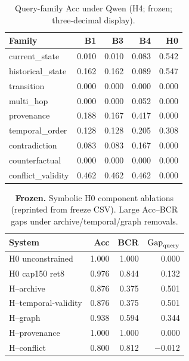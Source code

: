 \begin{table}[t]
\centering
\caption{Query-family Acc under Qwen (H4; frozen; three-decimal display).}
\label{tab:queryfam}
\scriptsize
\begin{tabular}{lrrrr}
\toprule
Family & B1 & B3 & B4 & H0 \\
\midrule
current\_state & 0.010 & 0.010 & 0.083 & 0.542 \\
historical\_state & 0.162 & 0.162 & 0.089 & 0.547 \\
transition & 0.000 & 0.000 & 0.000 & 0.000 \\
multi\_hop & 0.000 & 0.000 & 0.052 & 0.000 \\
provenance & 0.188 & 0.167 & 0.417 & 0.000 \\
temporal\_order & 0.128 & 0.128 & 0.205 & 0.308 \\
contradiction & 0.083 & 0.083 & 0.167 & 0.000 \\
counterfactual & 0.000 & 0.000 & 0.000 & 0.000 \\
conflict\_validity & 0.462 & 0.462 & 0.462 & 0.000 \\
\bottomrule
\end{tabular}
\end{table}

\begin{table}[t]
\centering
\caption{\textbf{Frozen.} Symbolic H0 component ablations (reprinted from freeze CSV). Large Acc--BCR gaps under archive/temporal/graph removals.}
\label{tab:ablations}
\small
\begin{tabular}{lrrr}
\toprule
System & Acc & BCR & $\mathrm{Gap}_{\mathrm{query}}$ \\
\midrule
H0 unconstrained & 1.000 & 1.000 & 0.000 \\
H0 cap150 ret8 & 0.976 & 0.844 & 0.132 \\
H--archive & 0.876 & 0.375 & 0.501 \\
H--temporal-validity & 0.876 & 0.375 & 0.501 \\
H--graph & 0.938 & 0.594 & 0.344 \\
H--provenance & 1.000 & 1.000 & 0.000 \\
H--conflict & 0.800 & 0.812 & $-$0.012 \\
\bottomrule
\end{tabular}
\end{table}

